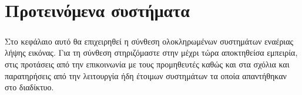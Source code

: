 \documentclass[a4paper, 12pt, twoside]{report}
\begin{document}
	
	\chapter{Προτεινόμενα συστήματα}
	
		\paragraph{}{Στο κεφάλαιο αυτό θα επιχειρηθεί η σύνθεση ολοκληρωμένων συστημάτων εναέριας λήψης εικόνας. Για τη σύνθεση στηριζόμαστε στην μέχρι τώρα αποκτηθείσα εμπειρία, στις προτάσεις από την επικοινωνία με τους προμηθευτές καθώς και στα σχόλια και παρατηρήσεις από την λειτουργία ήδη έτοιμων συστημάτων τα οποία απαντήθηκαν στο διαδίκτυο.
		}
		
		\begin{landscape}
			\setlength\LTleft{0pt}            %
			\setlength\LTright{0pt}           %
			

\end{landscape}
\end{document}
